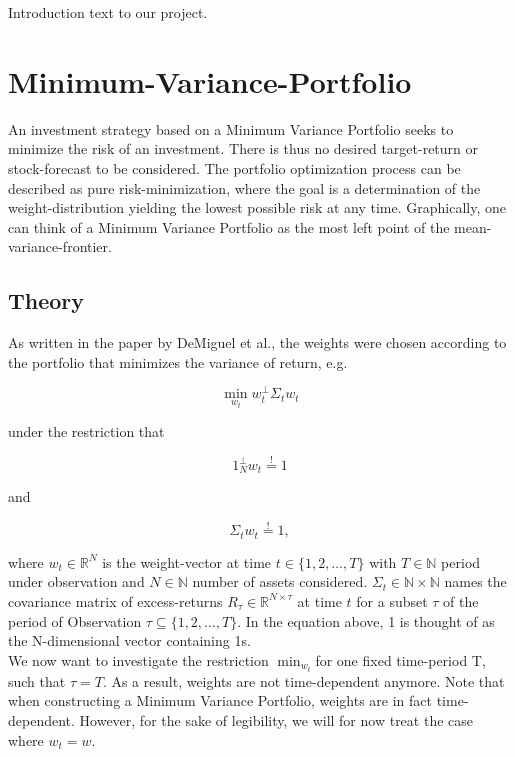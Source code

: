 Introduction text to our project.


\section{Minimum-Variance-Portfolio}
An investment strategy based on a Minimum Variance Portfolio seeks to minimize the risk of an investment. There is thus no desired target-return or stock-forecast to be considered. The portfolio optimization process can be described as pure risk-minimization, where the goal is a determination of the weight-distribution yielding the lowest possible risk at any time. Graphically, one can think of a Minimum Variance Portfolio as the most left point of the mean-variance-frontier.

\subsection{Theory}
As written in the paper by DeMiguel et al.\cite{DEM09}, the weights were chosen according to the portfolio that minimizes the variance of return, e.g. 

\begin{equation} \label{eq:1}
\min_{w_t} w_t^{\perp}\Sigma_{t}w_{t}
\end{equation}

under the restriction that 

\begin{equation} \label{eq:2}
1_{N}^{\perp}w_{t} \overset{!}{=} 1
\end{equation}

and

\begin{equation} \label{eq:3}
\Sigma_t w_t \overset{!}{=} 1,
\end{equation}

where $w_t \in \mathbb{R}^{N}$ is the weight-vector at time $t \in \lbrace 1, 2, \dots, T \rbrace$ with $T \in \mathbb{N}$ period under observation and $N \in \mathbb{N}$ number of assets considered. $\Sigma_t \in \mathbb{N \times N}$ names the covariance matrix of excess-returns $R_{\tau} \in \mathbb{R}^{N \times \tau}$ at time $t$ for a subset $\tau$ of the period of Observation $\tau \subseteq \lbrace 1, 2, \dots, T \rbrace$. In the equation above, 1 is thought of as the N-dimensional vector containing 1s. \\

We now want to investigate the restriction $\min_{w_t}$for one fixed time-period T, such that $\tau = T$. As a result, weights are not time-dependent anymore. Note that when constructing a Minimum Variance Portfolio, weights are in fact time-dependent. However, for the sake of legibility, we will for now treat the case where $w_t = w$.\\

